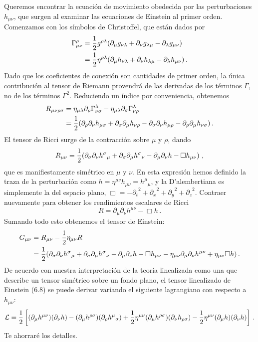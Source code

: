 \documentclass[11pt,b5paper,openany,twoside]{book}
\newcommand{\mn}{{\mu\nu}}
\newcommand{\p}[1]{{\partial_{#1}}}
\begin{document}
Queremos encontrar la ecuación de movimiento obedecida por las perturbaciones $h_\mn$, que surgen al examinar las ecuaciones de Einstein al primer orden.
Comenzamos con los símbolos de Christoffel, que están dados por
\begin{align}
\Gamma^\rho_{\mn} &=  {1\over 2} g^{\rho\lambda}
(\p\mu g_{\nu\lambda} + \p\nu g_{\lambda\mu} - \p\lambda g_{\mn}) \notag \\
&=  {1\over 2}\eta^{\rho\lambda}(\p\mu h_{\nu\lambda}
+ \p\nu h_{\lambda\mu} - \p\lambda h_{\mn})\,. \label{6.4}
\end{align}
Dado que los coeficientes de conexión son cantidades de primer orden, la única contribución al tensor de Riemann provendrá de las derivadas de los términos $\Gamma$, no de los términos $\Gamma^2$.
Reduciendo un índice por conveniencia, obtenemos
\begin{align}
R_{\mn\rho\sigma}  &=  \eta_{\mu\lambda}\p\rho
\Gamma^\lambda_{\nu\sigma} - \eta_{\mu\lambda}\p\sigma
\Gamma^\lambda_{\nu\rho}  \notag \\
&=  {1\over 2}(\p\rho\p\nu h_{\mu\sigma} + \p\sigma\p\mu h_{\nu\rho}
-\p\sigma\p\nu h_{\mu\rho}-\p\rho\p\mu h_{\nu\sigma})\,.
\label{6.5}
\end{align}
El tensor de Ricci surge de la contracción sobre $\mu$ y $\rho$, dando
\begin{equation}
R_\mn = {1\over 2}(\p\sigma\p\nu h^\sigma{}_\mu
+\p\sigma\p\mu h^\sigma{}_\nu - \p\mu\p\nu h - \Box h_\mn)\ ,
\label{6.6}
\end{equation}
que es manifiestamente simétrico en $\mu$ y $\nu$.
En esta expresión hemos definido la traza de la perturbación como $h=\eta^\mn h_\mn = h^\mu{}_\mu$, y la D'alembertiana es simplemente la del espacio plano, $\Box = -\p{t}^2+\p{x}^2+\p{y}^2+\p{z}^2$.
Contraer nuevamente para obtener los rendimientos escalares de Ricci
\begin{equation}
R = \p\mu\p\nu h^\mn - \Box h\,.\label{6.7}
\end{equation}
Sumando todo esto obtenemos el tensor de Einstein:
\begin{align}
G_\mn  &=  R_\mn - {1\over 2}\eta_\mn R \notag \\
&=  {1\over 2}(\p\sigma\p\nu h^\sigma{}_\mu
+\p\sigma\p\mu h^\sigma{}_\nu - \p\mu\p\nu h - \Box h_\mn
-\eta_\mn \p\mu\p\nu h^\mn + \eta_\mn \Box h)\,. \label{6.8}
\end{align}
De acuerdo con nuestra interpretación de la teoría linealizada como una que describe un tensor simétrico sobre un fondo plano, el tensor linealizado de Einstein (6.8) se puede derivar variando el siguiente lagrangiano con respecto a $h_\mn$:
\begin{equation}
{\cal L} = {1\over 2}\left[(\p\mu h^\mn)(\p\nu h) -
(\p\mu h^{\rho\sigma})(\p\rho h^\mu{}_\sigma) + {1\over 2}
\eta^\mn(\p\mu h^{\rho\sigma})(\p\nu h_{\rho\sigma})
-{1\over 2}\eta^\mn(\p\mu h)(\p\nu h)\right]\,.\label{6.9}
\end{equation}
Te ahorraré los detalles.
\end{document}
